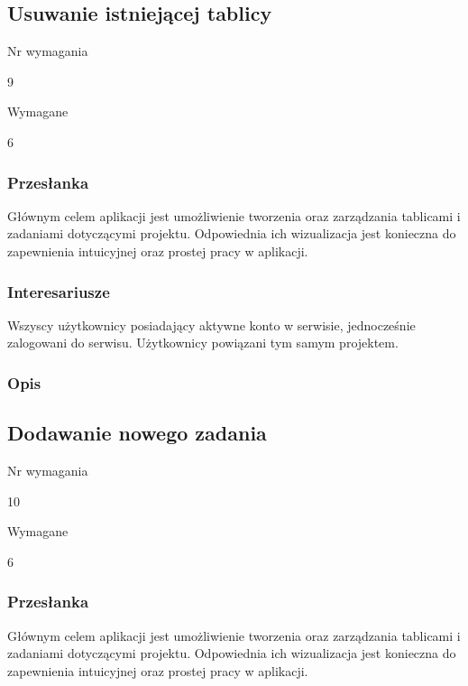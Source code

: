 \documentclass[eng,printmode]{mgr}
\begin{document}
\subsection{Usuwanie istniejącej tablicy}
\begin{labeling}{Nr wymagania}
\item [Nr wymagania:] 9
\item [Priorytet:] Wymagane
\item [Powiązania:] 6
\end{labeling}

\subsubsection{Przesłanka}
Głównym celem aplikacji jest umożliwienie tworzenia oraz zarządzania tablicami i zadaniami dotyczącymi projektu. Odpowiednia ich wizualizacja jest konieczna do zapewnienia intuicyjnej oraz prostej pracy w aplikacji.

\subsubsection{Interesariusze}
Wszyscy użytkownicy posiadający aktywne konto w serwisie, jednocześnie zalogowani do serwisu. Użytkownicy powiązani tym samym projektem.

\subsubsection{Opis}
\newpage

\subsection{Dodawanie nowego zadania}
\begin{labeling}{Nr wymagania}
\item [Nr wymagania:] 10
\item [Priorytet:] Wymagane
\item [Powiązania:] 6
\end{labeling}

\subsubsection{Przesłanka}
Głównym celem aplikacji jest umożliwienie tworzenia oraz zarządzania tablicami i zadaniami dotyczącymi projektu. Odpowiednia ich wizualizacja jest konieczna do zapewnienia intuicyjnej oraz prostej pracy w aplikacji.
\end{document}
